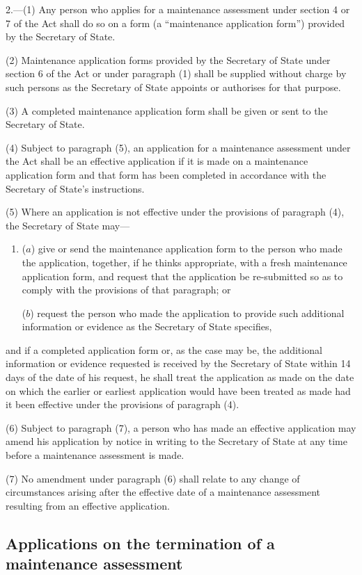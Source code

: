 \documentclass[a4paper,12pt]{article}
\begin{document}
2.—(1) Any person who applies for a maintenance assessment under section 4 or 7 of the Act shall do so on a form (a “maintenance application form”) provided by the Secretary of State.

(2) Maintenance application forms provided by the Secretary of State under section 6 of the Act or under paragraph (1) shall be supplied without charge by such persons as the Secretary of State appoints or authorises for that purpose.

(3) A completed maintenance application form shall be given or sent to the Secretary of State.

(4) Subject to paragraph (5), an application for a maintenance assessment under the Act shall be an effective application if it is made on a maintenance application form and that form has been completed in accordance with the Secretary of State’s instructions.

(5) Where an application is not effective under the provisions of paragraph (4), the Secretary of State may—
\begin{enumerate}\item[]
($a$) give or send the maintenance application form to the person who made the application, together, if he thinks appropriate, with a fresh maintenance application form, and request that the application be re-submitted so as to comply with the provisions of that paragraph; or

($b$) request the person who made the application to provide such additional information or evidence as the Secretary of State specifies,
\end{enumerate}
and if a completed application form or, as the case may be, the additional information or evidence requested is received by the Secretary of State within 14 days of the date of his request, he shall treat the application as made on the date on which the earlier or earliest application would have been treated as made had it been effective under the provisions of paragraph (4).

(6) Subject to paragraph (7), a person who has made an effective application may amend his application by notice in writing to the Secretary of State at any time before a maintenance assessment is made.

(7) No amendment under paragraph (6) shall relate to any change of circumstances arising after the effective date of a maintenance assessment resulting from an effective application.

\subsection[3. Applications on the termination of a maintenance assessment]{Applications on the termination of a maintenance assessment}
\end{document}
